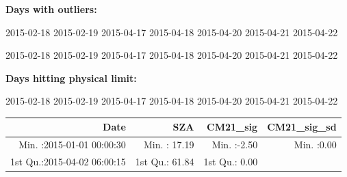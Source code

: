 \documentclass[
  10pt,
  a4paper,oneside]{article}
\begin{document}
\normalsize

\textbf{Days with outliers:}

2015-02-18 2015-02-19 2015-04-17 2015-04-18 2015-04-20 2015-04-21 2015-04-22

2015-02-18 2015-02-19 2015-04-17 2015-04-18 2015-04-20 2015-04-21 2015-04-22

\textbf{Days hitting physical limit:}

2015-02-18 2015-02-19 2015-04-17 2015-04-18 2015-04-20 2015-04-21 2015-04-22

\footnotesize

\begin{longtable}[]{@{}rrrr@{}}
\toprule
\begin{minipage}[b]{0.34\columnwidth}\raggedleft
Date\strut
\end{minipage} & \begin{minipage}[b]{0.19\columnwidth}\raggedleft
SZA\strut
\end{minipage} & \begin{minipage}[b]{0.18\columnwidth}\raggedleft
CM21\_sig\strut
\end{minipage} & \begin{minipage}[b]{0.18\columnwidth}\raggedleft
CM21\_sig\_sd\strut
\end{minipage}\tabularnewline
\midrule
\endhead
\begin{minipage}[t]{0.34\columnwidth}\raggedleft
Min. :2015-01-01 00:00:30\strut
\end{minipage} & \begin{minipage}[t]{0.19\columnwidth}\raggedleft
Min. : 17.19\strut
\end{minipage} & \begin{minipage}[t]{0.18\columnwidth}\raggedleft
Min. :-2.50\strut
\end{minipage} & \begin{minipage}[t]{0.18\columnwidth}\raggedleft
Min. :0.00\strut
\end{minipage}\tabularnewline
\begin{minipage}[t]{0.34\columnwidth}\raggedleft
1st Qu.:2015-04-02 06:00:15\strut
\end{minipage} & \begin{minipage}[t]{0.19\columnwidth}\raggedleft
1st Qu.: 61.84\strut
\end{minipage} & \begin{minipage}[t]{0.18\columnwidth}\raggedleft
1st Qu.: 0.00\strut
\end{minipage} & \begin{minipage}[t]{0.18\columnwidth}\raggedleft

\end{minipage}
\end{longtable}
\end{document}

